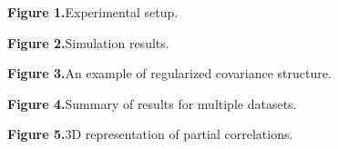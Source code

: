 \textbf{Figure 1.}{Experimental setup.}\label{fig:01}

\textbf{Figure 2.}{Simulation results.}\label{fig:02}

\textbf{Figure 3.}{An example of regularized covariance structure.}\label{fig:03}

\textbf{Figure 4.}{Summary of results for multiple datasets.}\label{fig:04}

\textbf{Figure 5.}{3D representation of partial correlations.}\label{fig:05}
